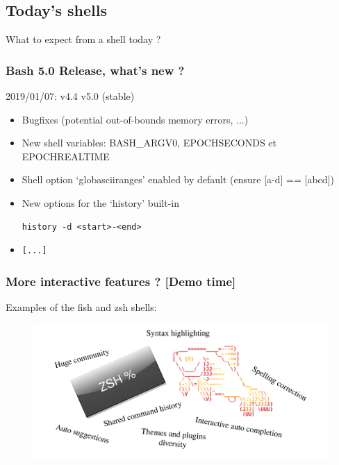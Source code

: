 \documentclass[aspectratio=169,10pt]{beamer}
\begin{document}
\subsection{Today's shells}

\begin{frame}[c]
    \begin{center}
        \huge What to expect from a shell today ?
    \end{center}
\end{frame}

\begin{frame}[fragile]
  \frametitle{Bash 5.0 Release, what's new ?}

    2019/01/07: v4.4 \textrightarrow{} v5.0 (stable)

    \vspace{\baselineskip}

  \begin{itemize}
      \item Bugfixes (potential out-of-bounds memory errors, ...)
      \item New shell variables: BASH\_ARGV0, EPOCHSECONDS et EPOCHREALTIME
      \item Shell option `globasciiranges' enabled by default (ensure [a-d] == [abcd])
      \item New options for the `history' built-in
          \begin{verbatim}history -d <start>-<end>\end{verbatim}
      \item \begin{verbatim}[...]\end{verbatim}
  \end{itemize}

\end{frame}

\begin{frame}
    \frametitle{More interactive features ? [Demo time]}
  Examples of the fish and zsh shells:
    \begin{figure}[h]
        \includegraphics[scale=0.8]{./images/zshFish}
    \end{figure}
\end{frame}
\end{document}
